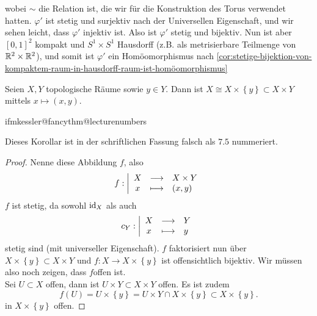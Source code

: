 \begin{example}
\begin{enumerate}[a)]
\begin{tikzcd}
           \end{tikzcd}
           wobei $\sim $ die Relation ist, die wir für die Konstruktion des Torus verwendet hatten. $\varphi '$ ist stetig und surjektiv nach der Universellen Eigenschaft, und wir sehen leicht, dass $\varphi '$ injektiv ist. Also ist $\varphi '$ stetig und bijektiv. Nun ist aber $[0,1]^2$ kompakt und $S^1 \times S^1$ Hausdorff (z.B. als metrisierbare Teilmenge von $\R^2 \times \R^2$), und somit ist $\varphi '$ ein Homöomorphismus nach \autoref{cor:stetige-bijektion-von-kompaktem-raum-in-hausdorff-raum-ist-homöomorphismus}
    \end{enumerate}
\end{example}
\begin{corollary}\label{cor:topologischer-raum-ist-natürlich-in-seinem-produkt-enthalten}
    Seien $X,Y$ topologische Räume sowie  $y\in Y$. Dann ist $X\cong X\times \left \{y\right\} \subset X\times Y$ mittels $x \mapsto (x,y)$.
\end{corollary}
\csname ifmkessler@fancythm@lecturenumbers\endcsname
\begin{remark*}[Nummerierung]   
    Dieses Korollar ist in der schriftlichen Fassung falsch als $7.5$ nummeriert.
\end{remark*}
\fi
\begin{proof}
    Nenne diese Abbildung $f$, also
        \begin{equation*}
        f: \left| \begin{array}{c c l} 
        X & \longrightarrow & X\times Y \\
        x & \longmapsto &  (x,y)
        \end{array} \right.
    \end{equation*}
$f$ ist stetig, da sowohl  $\id_X$ als auch
    \begin{equation*}
    c_Y: \left| \begin{array}{c c l} 
    X & \longrightarrow & Y \\
    x & \longmapsto &  y
    \end{array} \right.
\end{equation*}
stetig sind (mit universeller Eigenschaft). $f$ faktorisiert nun über  $X\times \left \{y\right\} \subset X\times Y$ und $f: X \to  X\times \left \{y\right\} $ ist offensichtlich bijektiv. Wir müssen also noch zeigen, dass $f$offen ist. \\
Sei  $U\subset X$ offen, dann ist $U\times Y \subset X\times Y$ offen. Es ist zudem
\[
    f(U) = U\times \left \{y\right\}  = U\times Y \cap  X \times \left \{y\right\}  \subset X\times \left \{y\right\} 
.\] 
in $X\times \left \{y\right\} $ offen.
\end{proof}
